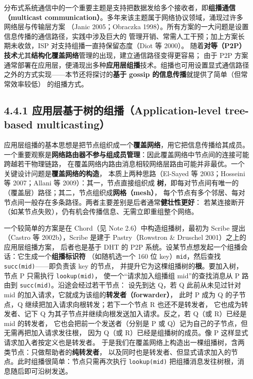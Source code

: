 

分布式系统通信中的一个重要主题是支持把数据发给多个接收者，即\textbf{组播通信（multicast
communication）}。多年来该主题属于网络协议领域，涌现过许多网络层与传输层方案
（Janic 2005；Obraczka 1998）。所有方案的一大问题是设置信息传播的通信路径，实践中涉及巨大的
管理开销、常需人工干预；加上方案长期未收敛，ISP 对支持组播一直持保留态度（Diot 等 2000）。
随着\textbf{对等（P2P）技术}尤其\textbf{结构化覆盖网络}管理的出现，建立通信路径变得更容易；
由于 P2P 方案通常部署在应用层，便涌现出多种\textbf{应用层组播}技术。组播也可用设置显式通信路径
之外的方式实现——本节还将探讨的\textbf{基于 gossip 的信息传播}就提供了简单（但常常效率较低）
的组播方式。

\subsection*{4.4.1 应用层基于树的组播（Application-level tree-based multicasting）}
应用层组播的基本思想是把节点组织成一个\textbf{覆盖网络}，用它把信息传播给其成员。
一个重要观察是\textbf{网络路由器不参与组成员管理}：因此覆盖网络中节点间的连接可能跨越若干物理链路，
在覆盖网络内路由消息相较网络层路由可能并非最优。一个关键设计问题是\textbf{覆盖网络的构造}，
本质上两种思路（El-Sayed 等 2003；Hosseini 等 2007；Allani 等 2009）：其一，节点直接组织成
\textbf{树}，即每对节点间有唯一的（覆盖层）路径；其二，节点组织成\textbf{网格（mesh）}，
每个节点有多个邻居、每对节点间一般存在多条路径。两者主要差别是后者通常\textbf{健壮性更好}：
若某连接断开（如某节点失败），仍有机会传播信息、无需立即重组整个网络。

\begin{ideabox}
一个较简单的方案是在 Chord（见 Note 2.6）中构造组播树，最初为 Scribe 提出
（Castro 等 2002b），Scribe 是建于 Pastry（Rowstron \& Druschel 2001）之上的应用层组播方案，
后者也是基于 DHT 的 P2P 系统。设某节点想发起一个组播会话：它生成一个\textbf{组播标识符}
（如随机选一个 160 位 key）\texttt{mid}，然后查找 \texttt{succ(mid)}——即负责该 key 的节点，
并提升它为这棵组播树的\textbf{根}。要加入树，节点 P 只需执行 \texttt{lookup(mid)}，
使一个“请求加入组播组 mid”的查找消息从 P 路由到 \texttt{succ(mid)}。沿途会经过若干节点：
设先到达 Q，若 Q 此前从未见过针对 mid 的加入请求，它就成为该组的\textbf{转发者（forwarder）}，
此时 P 成为 Q 的子节点，Q 继续把加入请求向根转发；若下一个节点 R 也还不是转发者，
它也成为转发者、记下 Q 为其子节点并继续向根发送加入请求。反之，若 Q（或 R）已经是 mid 的转发者，
它也会把前一个发送者（分别是 P 或 Q）记为自己的子节点，但无需再把加入请求发往根，
因为 Q（或 R）已经是组播树的成员。像 P 这样显式请求加入者按定义也是转发者。
于是我们在覆盖网络上构造出一棵组播树，含两类节点：只做帮助者的\textbf{纯转发者}，
以及同时也是转发者、但显式请求加入的节点。此时组播很简单：节点只需再次执行 \texttt{lookup(mid)}
把组播消息发往树根，消息随后即可沿树发送。
\end{ideabox}

